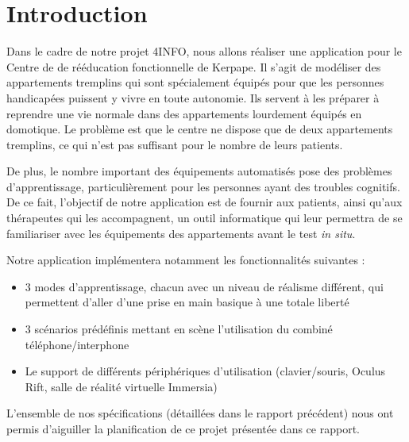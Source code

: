 \section{Introduction}
Dans le cadre de notre projet 4INFO, nous allons réaliser une application pour le Centre de de rééducation fonctionnelle de Kerpape. Il s'agit de modéliser des appartements tremplins qui sont spécialement équipés pour que les personnes handicapées puissent y vivre en toute autonomie. Ils servent à les préparer à reprendre une vie normale dans des appartements lourdement équipés en domotique. Le problème est que le centre ne dispose que de deux appartements tremplins, ce qui n'est pas suffisant pour le nombre de leurs patients.\newline

De plus, le nombre important des équipements automatisés pose des problèmes d'apprentissage, particulièrement pour les personnes ayant des troubles cognitifs. De ce fait, l'objectif de notre application est de fournir aux patients, ainsi qu'aux thérapeutes qui les accompagnent, un outil informatique qui leur permettra de se familiariser avec les équipements des appartements avant le test \textit{in situ}. \newline

Notre application implémentera notamment les fonctionnalités suivantes :
\begin{itemize}\renewcommand{\labelitemi}{$\bullet$}
	\item 3 modes d'apprentissage, chacun avec un niveau de réalisme différent, qui permettent d'aller d'une prise en main basique à une totale liberté
	\item 3 scénarios prédéfinis mettant en scène l'utilisation du combiné téléphone/interphone
 	\item Le support de différents périphériques d'utilisation (clavier/souris, Oculus Rift, salle de réalité virtuelle Immersia)
\end{itemize}
\vspace{0.5cm}
\hspace{0.5cm}L'ensemble de nos spécifications (détaillées dans le rapport précédent) nous ont permis d'aiguiller la planification de ce projet présentée dans ce rapport.